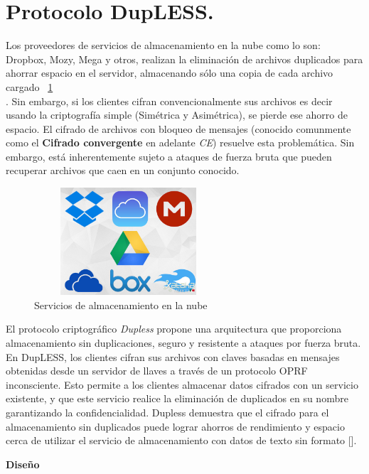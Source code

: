 


\section{Protocolo DupLESS. }
Los proveedores de servicios de almacenamiento en la nube como lo son:  Dropbox, Mozy, Mega y otros, realizan la eliminación de archivos duplicados para ahorrar espacio en el servidor, almacenando sólo una copia de cada archivo cargado ~\ref{fig:4-0-1} \\
. Sin embargo, si los clientes cifran convencionalmente sus archivos es decir usando la criptografía simple (Simétrica y Asimétrica), se pierde ese ahorro de espacio. El cifrado de archivos con bloqueo de mensajes (conocido comunmente como el \textbf{Cifrado convergente} en adelante \textit{CE}) resuelve esta problemática. Sin embargo, está inherentemente sujeto a ataques de fuerza bruta que pueden recuperar archivos que caen en un conjunto conocido.\\


\begin{figure}[H]
\centering
	\includegraphics[width=7cm, height=4cm]{./images/servicios_nube.jpg}
	\caption{Servicios de almacenamiento en la nube}
	\label{fig:4-0-1}
\end{figure}

El protocolo criptográfico \textit{Dupless} propone una arquitectura que proporciona almacenamiento sin duplicaciones, seguro y resistente a ataques por fuerza bruta. En DupLESS, los clientes cifran sus archivos con claves basadas en mensajes obtenidas
desde un servidor de llaves a través de un protocolo OPRF inconsciente. Esto permite a los clientes almacenar datos cifrados con un servicio existente, y que este servicio realice la eliminación de duplicados en su nombre garantizando la confidencialidad. Dupless demuestra que el cifrado para el almacenamiento sin duplicados puede lograr ahorros de rendimiento y espacio cerca de utilizar el servicio de almacenamiento con datos de texto sin formato [].



\textbf{Diseño} \\

